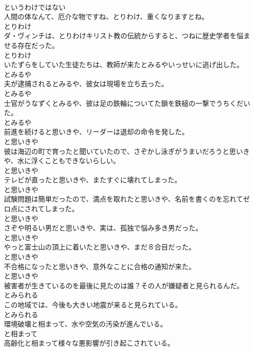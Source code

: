 \documentclass[8pt]{extreport}
\begin{document}
\begin{CJK}{UTF8}{min}
\\	というわけではない
\\	人間の体なんて、厄介な物ですね、とりわけ、重くなりますとね。	
\\	とりわけ
\\	ダ・ヴィンチは、とりわけキリスト教の伝統からすると、つねに歴史学者を悩ませる存在だった。	
\\	とりわけ
\\	いたずらをしていた生徒たちは、教師が来たとみるやいっせいに逃げ出した。	
\\	とみるや
\\	夫が逮捕されるとみるや、彼女は現場を立ち去った。	
\\	とみるや
\\	士官がうなずくとみるや、彼は足の鉄輪についてた鎖を鉄槌の一撃でうちくだいた。	
\\	とみるや
\\	前進を続けると思いきや、リーダーは退却の命令を発した。	
\\	と思いきや
\\	彼は海辺の町で育ったと聞いていたので、さぞかし泳ぎがうまいだろうと思いきや、水に浮くこともできないらしい。	
\\	と思いきや
\\	テレビが直ったと思いきや、またすぐに壊れてしまった。	
\\	と思いきや
\\	試験問題は簡単だったので、満点を取れたと思いきや、名前を書くのを忘れてゼロ点にされてしまった。	
\\	と思いきや
\\	さぞや明るい男だと思いきや、実は、孤独で悩み多き男だった。	
\\	と思いきや
\\	やっと富士山の頂上に着いたと思いきや、まだ８合目だった。	
\\	と思いきや
\\	不合格になったと思いきや、意外なことに合格の通知が来た。	
\\	と思いきや
\\	被害者が生きているのを最後に見たのは誰？その人が嫌疑者と見られるんだ。	
\\	とみられる
\\	この地域では、今後も大きい地震が来ると見られている。	
\\	とみられる
\\	環境破壊と相まって、水や空気の汚染が進んでいる。	
\\	と相まって
\\	高齢化と相まって様々な悪影響が引き起こされている。	

\end{CJK}
\end{document}
